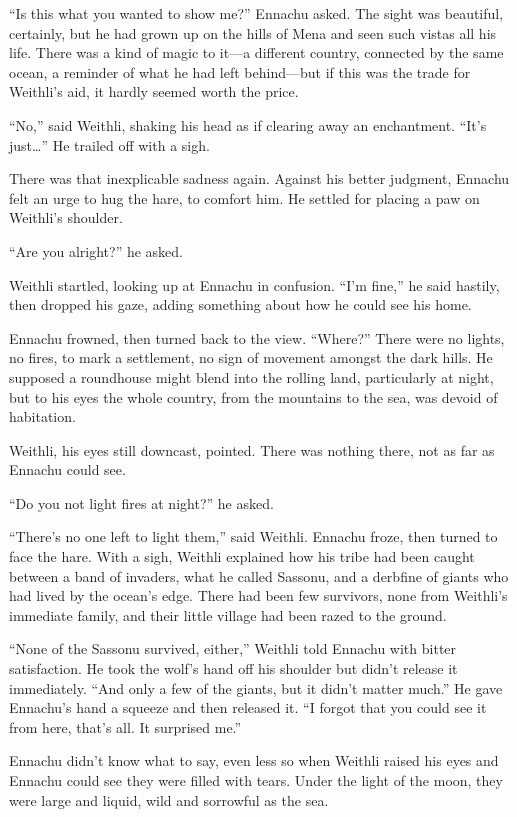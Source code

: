 ``Is this what you wanted to show me?'' Ennachu asked. The sight was beautiful, certainly, but he had grown up on the hills of Mena and seen such vistas all his life. There was a kind of magic to it---a different country, connected by the same ocean, a reminder of what he had left behind---but if this was the trade for Weithli's aid, it hardly seemed worth the price.

``No,'' said Weithli, shaking his head as if clearing away an enchantment. ``It's just\ldots'' He trailed off with a sigh.

There was that inexplicable sadness again. Against his better judgment, Ennachu felt an urge to hug the hare, to comfort him. He settled for placing a paw on Weithli's shoulder.

``Are you alright?'' he asked.

Weithli startled, looking up at Ennachu in confusion. ``I'm fine,'' he said hastily, then dropped his gaze, adding something about how he could see his home.

Ennachu frowned, then turned back to the view. ``Where?'' There were no lights, no fires, to mark a settlement, no sign of movement amongst the dark hills. He supposed a roundhouse might blend into the rolling land, particularly at night, but to his eyes the whole country, from the mountains to the sea, was devoid of habitation.

Weithli, his eyes still downcast, pointed. There was nothing there, not as far as Ennachu could see.

``Do you not light fires at night?'' he asked.

``There's no one left to light them,'' said Weithli. Ennachu froze, then turned to face the hare. With a sigh, Weithli explained how his tribe had been caught between a band of invaders, what he called Sassonu, and a derbfine of giants who had lived by the ocean's edge. There had been few survivors, none from Weithli's immediate family, and their little village had been razed to the ground.

``None of the Sassonu survived, either,'' Weithli told Ennachu with bitter satisfaction. He took the wolf's hand off his shoulder but didn't release it immediately. ``And only a few of the giants, but it didn't matter much.'' He gave Ennachu's hand a squeeze and then released it. ``I forgot that you could see it from here, that's all. It surprised me.''

Ennachu didn't know what to say, even less so when Weithli raised his eyes and Ennachu could see they were filled with tears. Under the light of the moon, they were large and liquid, wild and sorrowful as the sea.

